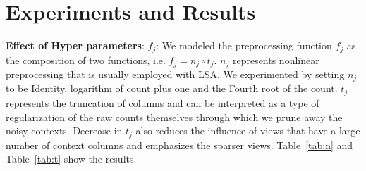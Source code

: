 \documentclass[11pt]{article}
\begin{document}
\section{Experiments and Results}
\label{sec:exp}

\noindent\textbf{Effect of Hyper parameters}: 
$f_j$: We modeled the preprocessing function $f_j$ as the composition
of two functions, i.e. $f_j = n_j \circ t_j$.
  $n_j$ represents nonlinear preprocessing that is usually
  employed with LSA. We experimented by setting $n_j$ to be
  Identity, logarithm of count plus one and the Fourth root of the
  count.
  $t_j$ represents the truncation of columns and can be interpreted as
  a type of regularization of the raw counts themselves through which
  we prune away the noisy contexts. Decrease in $t_j$
  also reduces the influence of views that have a large number of
  context columns and emphasizes the sparser views. 
  Table~\ref{tab:n} and Table~\ref{tab:t} show the results.
\end{document}
